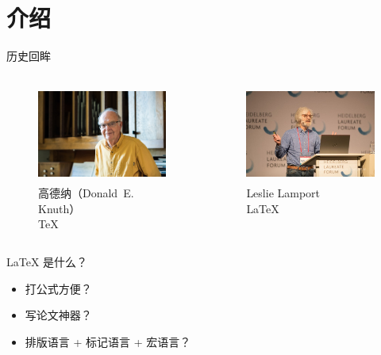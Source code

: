 \section{介绍}

\begin{frame}{历史回眸}
\begin{columns}
\begin{column}{0.45\textwidth}
  \begin{figure}
    \centering
    \includegraphics[height=3.2cm]{figures/Knuth-vivian20181019E.jpg}
    \caption{高德纳（Donald~E. Knuth）\footnotemark \\ \TeX}
  \end{figure}
\end{column}
\begin{column}{0.45\textwidth}
  \begin{figure}
    \centering
    \includegraphics[height=3.2cm]{figures/lamport-2018.jpg}
    \caption{Leslie Lamport~\footnotemark \\ \LaTeX}
  \end{figure}
\end{column}
\end{columns}
\end{frame}

\begin{frame}{\LaTeX{} 是什么？}
\begin{itemize}
  \item 打公式方便？
  \item 写论文神器？
  \item 排版语言 + 标记语言 + 宏语言？
\end{itemize}
\end{frame}

